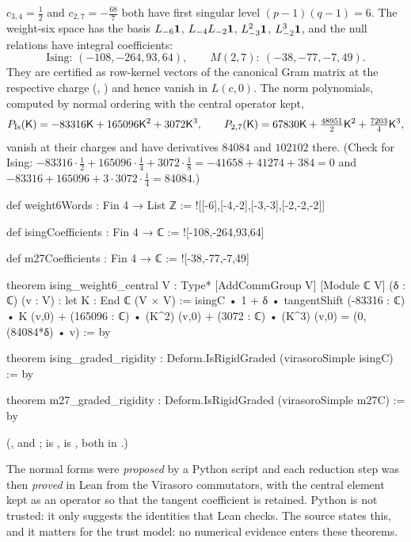 $c_{3,4} = \frac12$ and $c_{2,7} = -\frac{68}7$ both have first singular level $(p-1)(q-1) = 6$. The weight-six
space has the basis $L_{-6}\mathbf{1}$, $L_{-4}L_{-2}\mathbf{1}$, $L_{-3}^2\mathbf{1}$, $L_{-2}^3\mathbf{1}$, and the null relations
have integral coefficients:
\begin{equation*}
 \text{Ising: }(-108,-264,93,64),\qquad M(2,7):\ (-38,-77,-7,49).
\end{equation*}
They are certified as row-kernel vectors of the canonical Gram matrix  at the respective
charge (, ) and hence vanish in $L(c,0)$. The norm polynomials,
computed by normal ordering with the central operator kept,
\begin{equation*}
 P_{\mathrm{Is}}(\mathsf{K}) = -83316\mathsf{K} + 165096\mathsf{K}^2 + 3072\mathsf{K}^3,\qquad
 P_{2,7}(\mathsf{K}) = 67830\mathsf{K} + \tfrac{48951}{2}\mathsf{K}^2 + \tfrac{7203}{4}\mathsf{K}^3,
\end{equation*}
vanish at their charges and have derivatives $84084$ and $102102$ there. (Check for Ising:
$-83316\cdot\frac12+165096\cdot\frac14+3072\cdot\frac18 = -41658+41274+384 = 0$ and
$-83316+165096+3\cdot3072\cdot\frac14 = 84084$.)
\begin{leancode}
def weight6Words : Fin 4 → List ℤ := ![[-6],[-4,-2],[-3,-3],[-2,-2,-2]]

def isingCoefficients : Fin 4 → ℂ := ![-108,-264,93,64]

def m27Coefficients : Fin 4 → ℂ := ![-38,-77,-7,49]

theorem ising_weight6_central {V : Type*} [AddCommGroup V] [Module ℂ V]
    (δ : ℂ) (v : V) :
    let K : End ℂ (V × V) := isingC • 1 + δ • tangentShift
    (-83316 : ℂ) • K (v,0) + (165096 : ℂ) • (K^2) (v,0) +
      (3072 : ℂ) • (K^3) (v,0) = (0, (84084*δ) • v) := by

theorem ising_graded_rigidity : Deform.IsRigidGraded (virasoroSimple isingC) := by

theorem m27_graded_rigidity : Deform.IsRigidGraded (virasoroSimple m27C) := by
\end{leancode}
(,  and
;  is ,
 is , both in .)

\begin{dictionary}
The normal forms were \emph{proposed} by a Python script
and each reduction step was then \emph{proved} in Lean from the Virasoro commutators, with the central
element kept as an operator so that the tangent coefficient is retained. Python is not trusted: it only
suggests the identities that Lean checks. The source states this, and it matters for the trust model: no
numerical evidence enters these theorems.
\end{dictionary}


